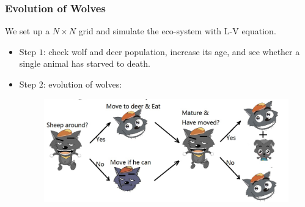 \documentclass{beamer}
\begin{document}
\frame
{
  	\frametitle{Evolution of Wolves}
 	 We set up a $N \times N$ grid and simulate the eco-system with L-V equation. \\
  	 \begin{itemize}
  	\item<1->{Step $1$: check wolf and deer population, increase its age, and see whether a single animal has starved to death.}
  	\item<2->{Step $2$: evolution of wolves:
  
 	 \begin{figure}[htb]
  	\begin{center}
 	 \includegraphics[width=\textwidth]{./pics/wolf.jpeg}
 	 \label{default}
  	\end{center}
  	\end{figure}
 	 }
 	 \end{itemize}
}
\end{document}
